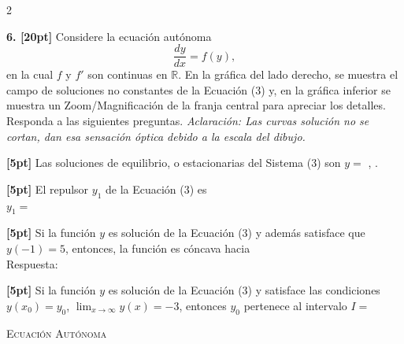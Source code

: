 \documentclass[11pt]{article}
\begin{document}
\begin{multicols}{2}

\textbf{6. [20pt]} Considere la ecuación autónoma
\[
\frac{dy}{dx}=f(y), \tag{3}
\]
en la cual $f$ y $f'$ son continuas en $\mathbb{R}$. En la gráfica del lado derecho, se muestra el campo de soluciones no constantes de la Ecuación (3) y, en la gráfica inferior se muestra un Zoom/Magnificación de la franja central para apreciar los detalles. Responda a las siguientes preguntas. \textit{Aclaración: Las curvas solución no se cortan, dan esa sensación óptica debido a la escala del dibujo.}

\begin{opciones}
\item[(a)] \textbf{[5pt]} Las soluciones de equilibrio, o estacionarias del Sistema (3) son $y=$ \underline{\hspace{1.2cm}}, \underline{\hspace{1.2cm}}.
\item[(b)] \textbf{[5pt]} El repulsor $y_1$ de la Ecuación (3) es\\
$y_1=$ \underline{\hspace{2cm}}
\item[(c)] \textbf{[5pt]} Si la función $y$ es solución de la Ecuación (3) y además satisface que $y(-1)=5$, entonces, la función es cóncava hacia\\
Respuesta: \underline{\hspace{2.5cm}}
\item[(d)] \textbf{[5pt]} Si la función $y$ es solución de la Ecuación (3) y satisface las condiciones $y(x_0)=y_0$, $\displaystyle\lim_{x\to\infty} y(x)=-3$, entonces $y_0$ pertenece al intervalo $I=$ \underline{\hspace{2.5cm}}
\end{opciones}

\columnbreak

\begin{center}
\textsc{\footnotesize Ecuación Autónoma}\\[2pt]


\end{center}
\end{multicols}
\end{document}
